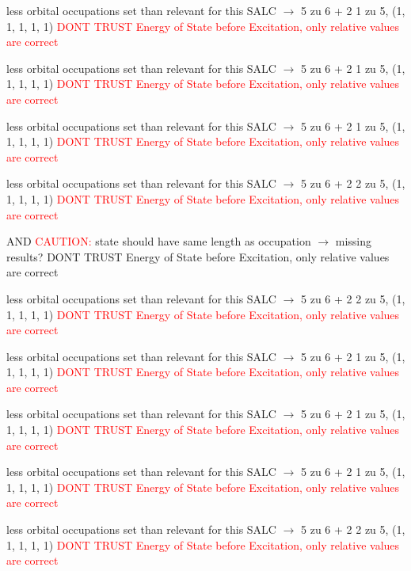 \documentclass[12pt,a4paper]{article}
\begin{document}
less orbital occupations set than relevant for this SALC $\rightarrow$ 
5 zu 6 + 2 
1 zu 5, (1, 1, 1, 1, 1) 
\textcolor{red}{DONT TRUST \glqq{}Energy of State before Excitation\grqq{}, only relative values are correct}

less orbital occupations set than relevant for this SALC $\rightarrow$ 
5 zu 6 + 2 
1 zu 5, (1, 1, 1, 1, 1) 
\textcolor{red}{DONT TRUST \glqq{}Energy of State before Excitation\grqq{}, only relative values are correct}

less orbital occupations set than relevant for this SALC $\rightarrow$ 
5 zu 6 + 2 
1 zu 5, (1, 1, 1, 1, 1) 
\textcolor{red}{DONT TRUST \glqq{}Energy of State before Excitation\grqq{}, only relative values are correct}

less orbital occupations set than relevant for this SALC $\rightarrow$ 
5 zu 6 + 2 
2 zu 5, (1, 1, 1, 1, 1) 
\textcolor{red}{DONT TRUST \glqq{}Energy of State before Excitation\grqq{}, only relative values are correct}

 AND 	\textcolor{red}{CAUTION:} state should have same length as occupation $\rightarrow$ missing results?
	DONT TRUST \glqq{}Energy of State before Excitation\grqq{}, only relative values are correct

less orbital occupations set than relevant for this SALC $\rightarrow$ 
5 zu 6 + 2 
2 zu 5, (1, 1, 1, 1, 1) 
\textcolor{red}{DONT TRUST \glqq{}Energy of State before Excitation\grqq{}, only relative values are correct}

less orbital occupations set than relevant for this SALC $\rightarrow$ 
5 zu 6 + 2 
1 zu 5, (1, 1, 1, 1, 1) 
\textcolor{red}{DONT TRUST \glqq{}Energy of State before Excitation\grqq{}, only relative values are correct}

less orbital occupations set than relevant for this SALC $\rightarrow$ 
5 zu 6 + 2 
1 zu 5, (1, 1, 1, 1, 1) 
\textcolor{red}{DONT TRUST \glqq{}Energy of State before Excitation\grqq{}, only relative values are correct}

less orbital occupations set than relevant for this SALC $\rightarrow$ 
5 zu 6 + 2 
1 zu 5, (1, 1, 1, 1, 1) 
\textcolor{red}{DONT TRUST \glqq{}Energy of State before Excitation\grqq{}, only relative values are correct}

less orbital occupations set than relevant for this SALC $\rightarrow$ 
5 zu 6 + 2 
2 zu 5, (1, 1, 1, 1, 1) 
\textcolor{red}{DONT TRUST \glqq{}Energy of State before Excitation\grqq{}, only relative values are correct}
\end{document}
